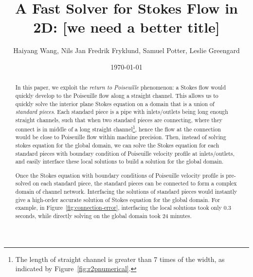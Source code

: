 \documentclass[10pt,twocolumn,letterpaper]{article}
\author{Haiyang Wang, Nils Jan Fredrik Fryklund, Samuel Potter, Leslie Greengard}
\date{\today}
\title{A Fast Solver for Stokes Flow in 2D: [we need a better title]}
\begin{document}
\maketitle

\begin{abstract}
  In this paper, we exploit the \textit{return to Poiseuille} phenomenon:
  a Stokes flow would quickly develop to the Poiseuille flow along a straight channel.
  This allows us to quickly solve the interior plane Stokes equation
  on a domain that is a union of \textit{standard pieces}.
  Each standard piece is a pipe with inlets/outlets
  being long enough straight channels, such that when two standard pieces are connecting,
  where they connect is in middle of a long
  straight channel\footnote{
    The length of straight channel is greater than 7 times of the width,
    as indicated by Figure~\ref{fig:r2pnumerical}.}, hence the flow
  at the connection would be close to Poiseuille flow within machine precision.
  Then, instead of solving stokes equation for the global domain,
  we can solve the Stokes equation
  for each standard pieces with boundary condition of Poiseuille velocity profile at inlets/outlets,
  and easily interface these local solutions to build a solution for the global domain.

  Once the Stokes equation with boundary conditions of Poiseuille velocity
  profile is pre-solved on each standard piece, the standard pieces can be
  connected to form a complex domain of channel network. Interfacing the
  solutions of standard pieces would instantly give a high-order accurate
  solution of Stokes equation for the global domain. For example, in
  Figure~\ref{fig:connection-error}, interfacing the local solutions took only
  0.3 seconds, while directly solving on the global domain took 24 minutes.
\end{abstract}
\end{document}

